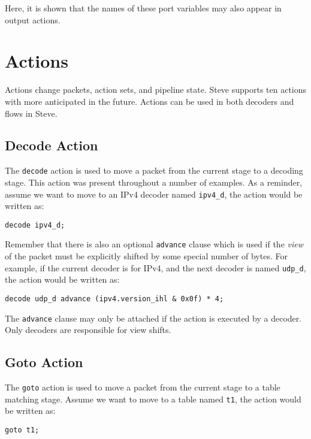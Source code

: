 Here, it is shown that the names of these port variables may also appear in
output actions.

\section{Actions} \label{tut:action}

Actions change packets, action sets, and pipeline state. Steve supports ten
actions with more anticipated in the future. Actions can be used in both
decoders and flows in Steve.

\subsection{Decode Action} \label{tut:decode_action}

The \texttt{decode} action is used to move a packet from the current stage to a
decoding stage. This action was present throughout a number of examples. As a
reminder, assume we want to move to an IPv4 decoder named \texttt{ipv4\_d}, the
action would be written as:

\begin{lstlisting}
decode ipv4_d;
\end{lstlisting}

Remember that there is also an optional \texttt{advance} clause which is used if
the \textit{view} of the packet must be explicitly shifted by some special
number of bytes. For example, if the current decoder is for IPv4, and the next
decoder is named \texttt{udp\_d}, the action would be written as:

\begin{lstlisting}
decode udp_d advance (ipv4.version_ihl & 0x0f) * 4;
\end{lstlisting}

The \texttt{advance} clause may only be attached if the action is executed by a
decoder. Only decoders are responsible for view shifts.

\subsection{Goto Action} \label{tut:goto_action}

The \texttt{goto} action is used to move a packet from the current stage to a
table matching stage. Assume we want to move to a table named \texttt{t1}, the
action would be written as:

\begin{lstlisting}
goto t1;
\end{lstlisting}

